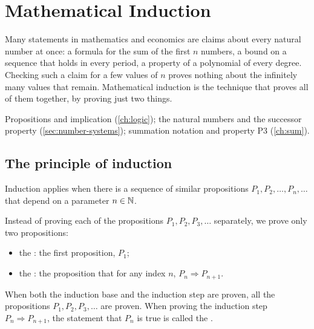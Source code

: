 \chapter{Mathematical Induction}\label{ch:ind}

\begin{chapterintro}
Many statements in mathematics and economics are claims about every natural number at once: a formula for the sum of
the first $n$ numbers, a bound on a sequence that holds in every period, a property of a polynomial of every degree.
Checking such a claim for a few values of $n$ proves nothing about the infinitely many values that remain.
Mathematical induction is the technique that proves all of them together, by proving just two things.
\end{chapterintro}

\begin{prerequisites}
Propositions and implication (\cref{ch:logic}); the natural numbers and the successor property (\cref{sec:number-systems});
summation notation and property P3 (\cref{ch:sum}).
\end{prerequisites}

\section{The principle of induction}\label{sec:ind-principle}

Induction applies when there is a sequence of similar propositions $P_1,P_2,\dots,P_n,\dots$ that depend on a
parameter $n\in\mathbb{N}$. 

\begin{principle}
Instead of proving each of the propositions $P_1,P_2,P_3,\dots$ separately, we prove only two propositions:
\begin{itemize}
  \item the : the first proposition, $P_1$;
  \item the : the proposition that for any index $n$, $P_n\Rightarrow P_{n+1}$.
\end{itemize}
When both the induction base and the induction step are proven, all the propositions $P_1,P_2,P_3,\dots$ are proven.
When proving the induction step $P_n\Rightarrow P_{n+1}$, the statement that $P_n$ is true is called the
. 
\end{principle}

